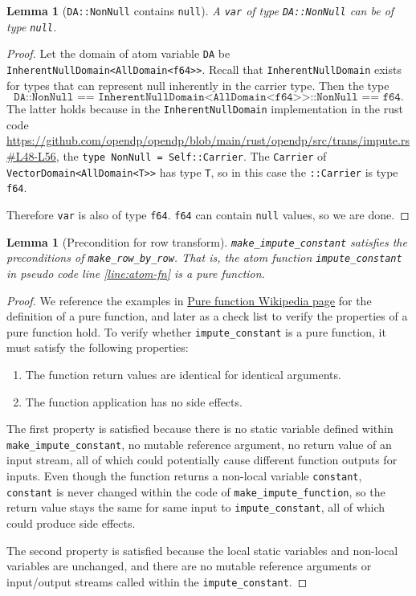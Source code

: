 \documentclass[11pt,a4paper]{article}
\newtheorem{lemma}[theorem]{Lemma}
\begin{document}
\begin{lemma}[\texttt{DA::NonNull} contains \texttt{null}] \label{lemma:NonNull}
A \texttt{var} of type \texttt{DA::NonNull} can be of type \texttt{null}.
\end{lemma}
\begin{proof}
Let the domain of atom variable \texttt{DA} be \texttt{InherentNullDomain<AllDomain<f64>>}. Recall that \texttt{InherentNullDomain} exists for types that can represent null inherently in the carrier type. Then the type $$\texttt{DA::NonNull == InherentNullDomain<AllDomain<f64>>::NonNull == f64}.$$ The latter holds because in the \texttt{InherentNullDomain} implementation in the rust code \url{https://github.com/opendp/opendp/blob/main/rust/opendp/src/trans/impute.rs#L48-L56}, the \texttt{type NonNull = Self::Carrier}. The \texttt{Carrier} of \texttt{VectorDomain<AllDomain<T>>} has type \texttt{T}, so in this case the \texttt{::Carrier} is type \texttt{f64}.

Therefore \texttt{var} is also of type \texttt{f64}. \texttt{f64} can contain \texttt{null} values, so we are done.
\end{proof}

\begin{lemma}[Precondition for row transform]\label{lemma:pure-fn}
\texttt{make\_impute\_constant} satisfies the preconditions of \texttt{make\_row\_by\_row}. That is, the atom function \texttt{impute\_constant} in pseudo code line \ref{line:atom-fn} is a pure function. 
\end{lemma}
\begin{proof}
We reference the examples in \href{https://en.wikipedia.org/wiki/Pure_function}{Pure function Wikipedia page} for the definition of a pure function, and later as a check list to verify the properties of a pure function hold. To verify whether \texttt{impute\_constant} is a pure function, it must satisfy the following properties:
\begin{enumerate}
    \item The function return values are identical for identical arguments.
    \item The function application has no side effects.
\end{enumerate}

The first property is satisfied because there is no static variable defined within \\\texttt{make\_impute\_constant}, no mutable reference argument, no return value of an input stream, all of which could potentially cause different function outputs for inputs. Even though the function returns a non-local variable \texttt{constant}, \texttt{constant} is never changed within the code of \texttt{make\_impute\_function}, so the return value stays the same for same input to \texttt{impute\_constant}, all of which could produce side effects.




The second property is satisfied because the local static variables and non-local variables are unchanged, and there are no mutable reference arguments or input/output streams called within the \texttt{impute\_constant}.
\end{proof}
\end{document}
